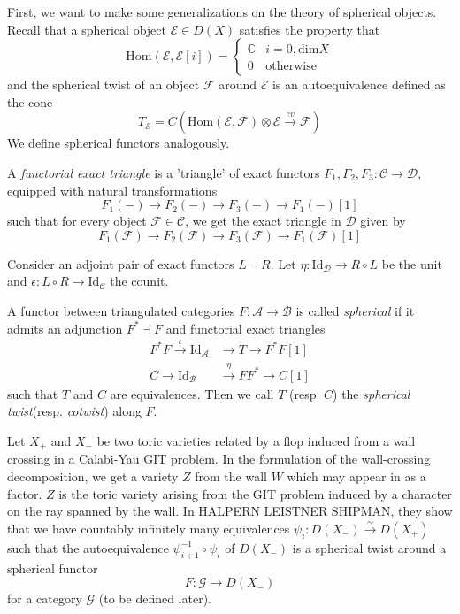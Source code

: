 First, we want to make some generalizations on the theory of spherical objects. Recall that a spherical object $\mathcal{E} \in D(X)$ satisfies the property that $$\mathrm{Hom}(\mathcal{E}, \mathcal{E}[i])= \begin{cases}
\mathbb{C} & i=0,\mathrm{dim}X  \\
0 & \text{otherwise}
\end{cases}$$
and the spherical twist of an object $\mathcal{F}$ around $\mathcal{E}$ is an autoequivalence defined as the cone $$T_\mathcal{E} = C(\mathrm{Hom}(\mathcal{E},\mathcal{F})\otimes \mathcal{E}\xrightarrow{ev} \mathcal{F})$$
We define spherical functors analogously.



\begin{definition}
	A \emph{functorial exact triangle} is a 'triangle' of exact functors $F_{1}, F_{2}, F_{3} : \mathcal{C}\to \mathcal{D}$,    equipped with natural transformations $$
F_{1}(-)\to F_{2}(-)\to F_{3}(-)\to F_{1}(-)[1]
$$ such that for every object $\mathcal{F}\in \mathcal{C}$,   we get the exact triangle in $\mathcal{D}$ given by $$
F_{1}(\mathcal{F})\to F_{2}(\mathcal{F})\to F_{3}(\mathcal{F})\to F_{1}(\mathcal{F})[1]
$$
\end{definition}

Consider an adjoint pair of exact functors $L \dashv R$. Let $\eta : \mathrm{Id}_\mathcal{D}\to R\circ L$ be the unit and $\epsilon : L\circ R \to \mathrm{Id}_\mathcal{C}$ the counit. 

\begin{definition}
A functor between triangulated categories $F: \mathcal{A}\to \mathcal{B}$ is called \emph{spherical} if it admits an adjunction $F^{*}\dashv F$ and  functorial exact triangles 
\begin{align}
F^{*}F \xrightarrow{\epsilon} \mathrm{Id}_\mathcal{A}&\to T \to F^{*}F [1] \\
C\to \mathrm{Id}_\mathcal{B}&\xrightarrow{\eta} F F^{*}\to C[1]
\end{align} such that $T$ and $C$ are equivalences. Then we call $T$ (resp. $C$) the \emph{spherical twist}(resp. \emph{cotwist}) along $F$. 
\end{definition}


Let $X_+$ and $X_-$ be two toric varieties related by a flop induced from a wall crossing in a Calabi-Yau GIT problem. In the formulation of the wall-crossing decomposition, we get a variety $Z$ from the wall $W$ which may appear in as a factor. $Z$ is the toric variety arising from the GIT problem induced by a character on the ray spanned by the wall. In HALPERN LEISTNER SHIPMAN, they show that we have countably infinitely many equivalences $\psi_{i}: D(X_{-})\xrightarrow{\sim} D(X_{+})$  such that the autoequivalence $\psi_{i+1}^{-1}\circ \psi_i$ of $D(X_{-})$ is a spherical twist around a spherical functor $$F : \mathcal{G}\to D(X_{-})$$ for a category $\mathcal{G}$ (to be defined later).

